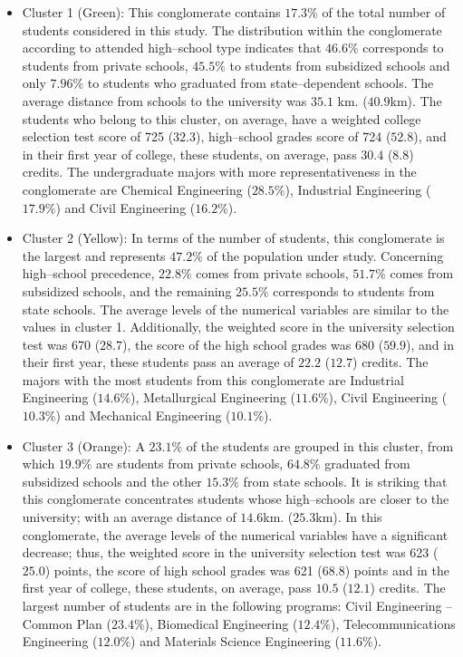 \documentclass[5p,authoryear,preprint,12pt]{elsarticle}
\begin{document}
\begin{itemize}
	\item Cluster 1 (Green): This conglomerate contains $17.3\%$ of the total number of students considered in this study. The distribution within the conglomerate according to attended high--school type indicates that $46.6\%$ corresponds to students from private schools, $45.5\%$ to students from subsidized schools and only $7.96\%$ to students who graduated from state--dependent schools. The average distance from schools to the university was $35.1$ \si{\km}. ($40.9 $\si{km}). The students who belong to this cluster, on average, have a weighted college selection test score of 725 ($32.3$), high--school grades score of 724 ($52.8$), and in their first year of college, these students, on average, pass $30.4$ ($8.8$) credits. The undergraduate majors with more representativeness in the conglomerate are Chemical Engineering ($28.5\%$), Industrial Engineering ($17.9\%$) and Civil Engineering ($16.2\%$).
	\vspace{0.5cm}
	\item Cluster 2 (Yellow): In terms of the number of students, this conglomerate is the largest and represents $47.2\%$ of the population under study. Concerning high--school precedence, $22.8\%$ comes from private schools, $51.7\%$ comes from subsidized schools, and the remaining $25.5\%$ corresponds to students from state schools. The average levels of the numerical variables are similar to the values in cluster 1. Additionally, the weighted score in the university selection test was 670 ($28.7$), the score of the high school grades was 680 ($59.9$), and in their first year, these students pass an average of $22.2$ ($12.7$) credits. The majors with the most students from this conglomerate are Industrial Engineering ($14.6\%$), Metallurgical Engineering ($11.6\%$), Civil Engineering ($10.3\%$) and Mechanical Engineering ($10.1\%$).
	\vspace{0.5cm}
	\item Cluster 3 (Orange): A $23.1\%$ of the students are grouped in this cluster, from which $19.9\%$ are students from private schools, $64.8\%$ graduated from subsidized schools and the other $15.3\%$ from state schools. It is striking that this conglomerate concentrates students whose high--schools are closer to the university; with an average distance of $14.6$\si{\km}. ($25.3$\si{km}). In this conglomerate, the average levels of the numerical variables have a significant decrease; thus, the weighted score in the university selection test was 623 ($25.0 $) points, the score of high school grades was 621 ($68.8 $) points and in the first year of college, these students, on average, pass $10.5 $ ($12.1 $) credits. The largest number of students are in the following programs: Civil Engineering -- Common Plan ($23.4\%$), Biomedical Engineering ($12.4\%$), Telecommunications Engineering ($12.0\%$) and Materials Science Engineering ($11.6\%$).

\end{itemize}
\end{document}
